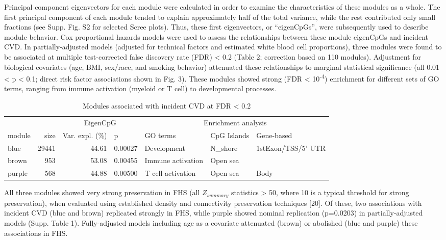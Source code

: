 \documentclass[]{bmcart}
\theoremstyle{definition}
\theoremstyle{definition}
\theoremstyle{definition}
\theoremstyle{remark}
\begin{document}
Principal component eigenvectors for each module were calculated in
order to examine the characteristics of these modules as a whole. The
first principal component of each module tended to explain approximately
half of the total variance, while the rest contributed only small
fractions (see Supp. Fig. S2 for selected Scree plots). Thus, these
first eigenvectors, or ``eigenCpGs'', were subsequently used to describe
module behavior. Cox proportional hazards models were used to assess the
relationships between these module eigenCpGs and incident CVD. In
partially-adjusted models (adjusted for technical factors and estimated
white blood cell proportions), three modules were found to be associated
at multiple test-corrected false discovery rate (FDR) \textless{} 0.2
(Table 2; correction based on 110 modules). Adjustment for biological
covariates (age, BMI, sex/race, and smoking behavior) attenuated these
relationships to marginal statistical significance (all 0.01 \textless{}
p \textless{} 0.1; direct risk factor associations shown in Fig. 3).
These modules showed strong (FDR \textless{} 10\textsuperscript{-4})
enrichment for different sets of GO terms, ranging from immune
activation (myeloid or T cell) to developmental processes.

\begin{table}

\caption{\label{tab:sig-module-table}Modules associated with incident CVD at FDR < 0.2}
\centering
\begin{tabular}[t]{lrrllll}
\toprule
\multicolumn{1}{c}{} & \multicolumn{1}{c}{} & \multicolumn{2}{c}{EigenCpG} & \multicolumn{3}{c}{Enrichment analysis} \\
\cmidrule(l{2pt}r{2pt}){3-4} \cmidrule(l{2pt}r{2pt}){5-7}
module & size & Var. expl. (\%) & p & GO terms & CpG Islands & Gene-based\\
\midrule
blue & 29441 & 44.61 & 0.00027 & Development & N\_shore & 1stExon/TSS/5' UTR\\
brown & 953 & 53.08 & 0.00455 & Immune activation & Open sea & \\
purple & 568 & 44.88 & 0.00500 & T cell activation & Open sea & Body\\
\bottomrule
\end{tabular}
\end{table}

All three modules showed very strong preservation in FHS (all
\(Z_{summary}\) statistics \textgreater{} 50, where 10 is a typical
threshold for strong preservation), when evaluated using established
density and connectivity preservation techniques {[}20{]}. Of these, two
associations with incident CVD (blue and brown) replicated strongly in
FHS, while purple showed nominal replication (p=0.0203) in
partially-adjusted models (Supp. Table 1). Fully-adjusted models
including age as a covariate attenuated (brown) or abolished (blue and
purple) these associations in FHS.
\end{document}
